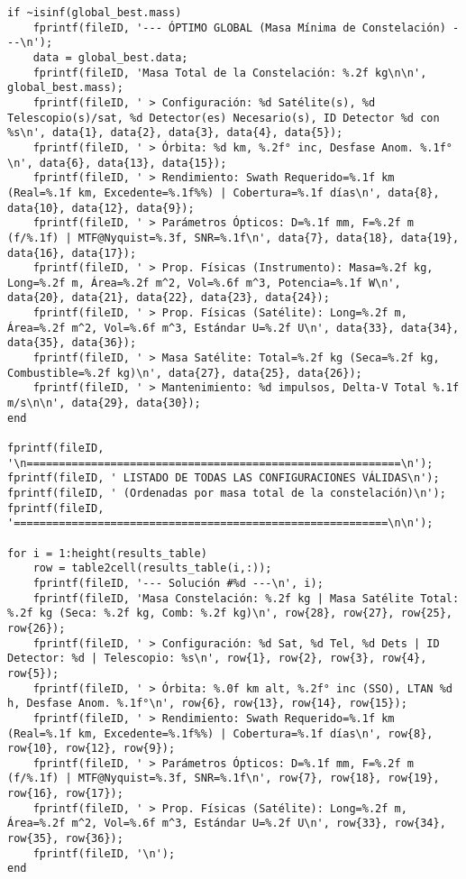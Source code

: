 \begin{verbatim}
if ~isinf(global_best.mass)
    fprintf(fileID, '--- ÓPTIMO GLOBAL (Masa Mínima de Constelación) ---\n');
    data = global_best.data;
    fprintf(fileID, 'Masa Total de la Constelación: %.2f kg\n\n', global_best.mass);
    fprintf(fileID, ' > Configuración: %d Satélite(s), %d Telescopio(s)/sat, %d Detector(es) Necesario(s), ID Detector %d con %s\n', data{1}, data{2}, data{3}, data{4}, data{5});
    fprintf(fileID, ' > Órbita: %d km, %.2f° inc, Desfase Anom. %.1f°\n', data{6}, data{13}, data{15});
    fprintf(fileID, ' > Rendimiento: Swath Requerido=%.1f km (Real=%.1f km, Excedente=%.1f%%) | Cobertura=%.1f días\n', data{8}, data{10}, data{12}, data{9});
    fprintf(fileID, ' > Parámetros Ópticos: D=%.1f mm, F=%.2f m (f/%.1f) | MTF@Nyquist=%.3f, SNR=%.1f\n', data{7}, data{18}, data{19}, data{16}, data{17});
    fprintf(fileID, ' > Prop. Físicas (Instrumento): Masa=%.2f kg, Long=%.2f m, Área=%.2f m^2, Vol=%.6f m^3, Potencia=%.1f W\n', data{20}, data{21}, data{22}, data{23}, data{24});
    fprintf(fileID, ' > Prop. Físicas (Satélite): Long=%.2f m, Área=%.2f m^2, Vol=%.6f m^3, Estándar U=%.2f U\n', data{33}, data{34}, data{35}, data{36});
    fprintf(fileID, ' > Masa Satélite: Total=%.2f kg (Seca=%.2f kg, Combustible=%.2f kg)\n', data{27}, data{25}, data{26});
    fprintf(fileID, ' > Mantenimiento: %d impulsos, Delta-V Total %.1f m/s\n\n', data{29}, data{30});
end

fprintf(fileID, '\n==========================================================\n');
fprintf(fileID, ' LISTADO DE TODAS LAS CONFIGURACIONES VÁLIDAS\n');
fprintf(fileID, ' (Ordenadas por masa total de la constelación)\n');
fprintf(fileID, '==========================================================\n\n');

for i = 1:height(results_table)
    row = table2cell(results_table(i,:));
    fprintf(fileID, '--- Solución #%d ---\n', i);
    fprintf(fileID, 'Masa Constelación: %.2f kg | Masa Satélite Total: %.2f kg (Seca: %.2f kg, Comb: %.2f kg)\n', row{28}, row{27}, row{25}, row{26});
    fprintf(fileID, ' > Configuración: %d Sat, %d Tel, %d Dets | ID Detector: %d | Telescopio: %s\n', row{1}, row{2}, row{3}, row{4}, row{5});
    fprintf(fileID, ' > Órbita: %.0f km alt, %.2f° inc (SSO), LTAN %d h, Desfase Anom. %.1f°\n', row{6}, row{13}, row{14}, row{15});
    fprintf(fileID, ' > Rendimiento: Swath Requerido=%.1f km (Real=%.1f km, Excedente=%.1f%%) | Cobertura=%.1f días\n', row{8}, row{10}, row{12}, row{9});
    fprintf(fileID, ' > Parámetros Ópticos: D=%.1f mm, F=%.2f m (f/%.1f) | MTF@Nyquist=%.3f, SNR=%.1f\n', row{7}, row{18}, row{19}, row{16}, row{17});
    fprintf(fileID, ' > Prop. Físicas (Satélite): Long=%.2f m, Área=%.2f m^2, Vol=%.6f m^3, Estándar U=%.2f U\n', row{33}, row{34}, row{35}, row{36});
    fprintf(fileID, '\n');
end


\end{verbatim}
